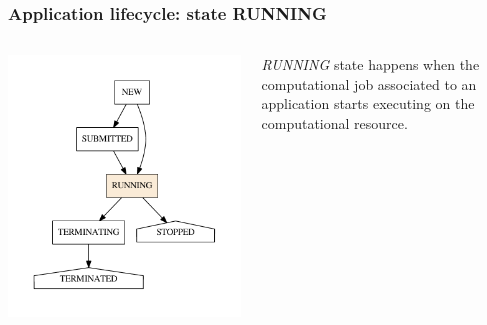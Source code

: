 \documentclass[english,serif,mathserif,xcolor=pdftex,dvipsnames,table]{beamer}
\begin{document}
\begin{frame}[fragile]
\frametitle{Application lifecycle: state RUNNING}

\begin{columns}[c]
  \begin{column}{0.5\textwidth}
    \includegraphics[height=0.7\textheight]{fig/states-RUNNING}
  \end{column}
  \begin{column}{0.5\textwidth}
    \raggedleft
    \emph{RUNNING} state happens when the computational job associated to an
    application starts executing on the computational resource.
  \end{column}
\end{columns}
\end{frame}
\end{document}
